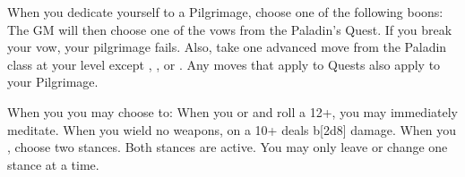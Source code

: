 \documentclass[darkmode]{dw_playbook}
\begin{document}
\begin{minipage}[t]{0.9\textwidth}
\begin{minipage}[t]{0.65\textwidth}
\begin{multicols*}{2}
            \vgap
                {When you dedicate yourself to a Pilgrimage, choose one of the following boons:
                \vsgap
                \vsgap
                \vsgap
                \vsgap
                The GM will then choose one of the vows from the Paladin’s Quest.  If you break your vow, your pilgrimage fails.
                \vsgap
                Also, take one advanced move from the Paladin class at your level except , , or .  Any moves that apply to Quests also apply to your Pilgrimage.}
        \end{multicols*}
        \sixUpMoves
        \begin{multicols*}{2}
            {When you  you may choose to:
            \vsgap
                }
            \vgap
                {
                When you  or  and roll a 12+, you may immediately meditate.}
                {When you wield no weapons, on a 10+  deals b[2d8] damage.
                \vsgap
                \vsgap
                }
            \vgap
                {
                When you , choose two stances.  Both stances are active.  You may only leave or change one stance at a time.}
            \end{multicols*}
    \end{minipage}
\end{minipage}
\begin{minipage}[t]{0.05\textwidth}
    ~ %
\end{minipage}
\end{document}
